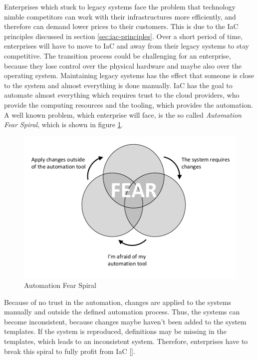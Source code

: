 Enterprises which stuck to legacy systems face the problem that technology nimble competitors can work with their infrastructures more efficiently, and therefore can demand lower prices to their customers. This is due to the IaC principles discussed in section \ref{sec:iac-principles}. Over a short period of time, enterprises will have to move to IaC and away from their legacy systems to stay competitive. The transition process could be challenging for an enterprise, because they lose control over the physical hardware and maybe also over the operating system. Maintaining legacy systems has the effect that someone is close to the system and almost everything is done manually. IaC has the goal to automate almost everything which requires trust to the cloud providers, who provide the computing resources and the tooling, which provides the automation. A well known problem, which enterprise will face, is the so called \emph{Automation Fear Spiral}, which is shown in figure \ref{fig:automation-fear-spiral}.

\begin{figure}[htbp]
	\centering
	\includegraphics[scale=.9]{images/automation-fear-spiral.pdf}
	\caption{Automation Fear Spiral}
	\label{fig:automation-fear-spiral}
\end{figure} 
Because of no trust in the automation, changes are applied to the systems manually and outside the defined automation process. Thus, the systems can become inconsistent, because changes maybe haven't been added to the system templates. If the system is reproduced, definitions may be missing in the templates, which leads to an inconsistent system. Therefore, enterprises have to break this spiral to fully profit from IaC [\cite[p. 9]{Morris2016}]. 

